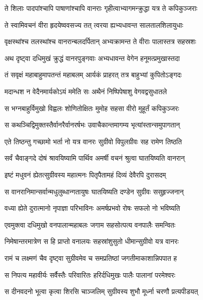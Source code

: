 \twolineshloka
{ते शिलाः पादपांश्चापि पाषाणांश्चापि वानराः}
{गृहीत्वाभ्यागमन्क्रुद्धा यत्र ते कपिकुञ्जराः} %

\twolineshloka
{ते स्वामिवचनं वीरा हृदयेष्ववसज्य तत्}
{त्वरया ह्यभ्यधावन्त सालतालशिलायुधाः} %

\twolineshloka
{वृक्षस्थांश्च तलस्थांश्च वानरान्बलदर्पितान्}
{अभ्यक्रामन्त ते वीराः पालास्तत्र सहस्रशः} %

\twolineshloka
{अथ दृष्ट्वा दधिमुखं क्रुद्धं वानरपुङ्गवाः}
{अभ्यधावन्त वेगेन हनूमत्प्रमुखास्तदा} %

\twolineshloka
{तं सवृक्षं महाबाहुमापतन्तं महाबलम्}
{आर्यकं प्राहरत् तत्र बाहुभ्यां कुपितोऽङ्गदः} %

\twolineshloka
{मदान्धश न वेदैनमार्यकोऽयं ममेति सः}
{अथैनं निष्पिपेषाशु वेगवद्वसुधातले} %

\twolineshloka
{स भग्नबाहुर्विमुखो विह्वलः शोणितोक्षितः}
{मुमोह सहसा वीरो मुहूर्तं कपिकुञ्जरः} %

\twolineshloka
{स कथञ्चिद्विमुक्तस्तैर्वानरैर्वानरर्षभः}
{उवाचैकान्तमागम्य भृत्यांस्तान्समुपागतान्} %

\twolineshloka
{एते तिष्ठन्तु गच्छामो भर्ता नो यत्र वानरः}
{सुग्रीवो विपुलग्रीवः सह रामेण तिष्ठति} %

\twolineshloka
{सर्वं चैवाङ्गदे दोषं श्रावयिष्यामि पार्थिव}
{अमर्षी वचनं श्रुत्वा घातयिष्यति वानरान्} %

\twolineshloka
{इष्टं मधुवनं ह्येतत्सुग्रीवस्य महात्मनः}
{पितृपैतामहं दिव्यं देवैरपि दुरासदम्} %

\twolineshloka
{स वानरानिमान्सर्वान्मधुलुब्धान्गतायुषः}
{घातयिष्यति दण्डेन सुग्रीवः ससुहृज्जनान्} %

\twolineshloka
{वध्या ह्येते दुरात्मानो नृपाज्ञा परिभाविनः}
{अमर्षप्रभवो रोषः सफलो नो भविष्यति} %

\twolineshloka
{एवमुक्त्वा दधिमुखो वनपालान्महाबलः}
{जगाम सहसोत्पत्य वनपालैः समन्वितः} %

\twolineshloka
{निमेषान्तरमात्रेण स हि प्राप्तो वनालयः}
{सहस्रांशुसुतो धीमान्सुग्रीवो यत्र वानरः} %

\twolineshloka
{रामं च लक्ष्मणं चैव दृष्ट्वा सुग्रीवमेव च}
{समप्रतिष्ठां जगतीमाकाशान्निपपात ह} %

\twolineshloka
{स निपत्य महावीर्यः सर्वैस्तैः परिवारितः}
{हरिर्दधिमुखः पालैः पालानां परमेश्वरः} %

\twolineshloka
{स दीनवदनो भूत्वा कृत्वा शिरसि चाञ्जलिम्}
{सुग्रीवस्य शुभौ मूर्ध्ना चरणौ प्रत्यपीडयत्} %


